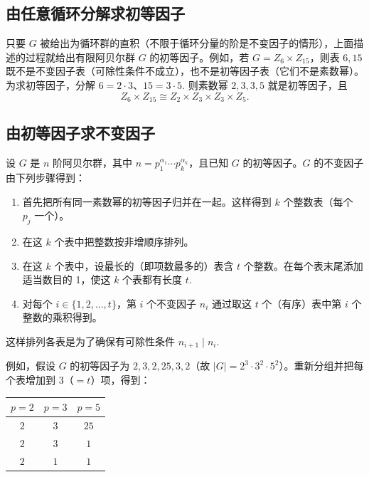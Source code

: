 \subsection*{由任意循环分解求初等因子}

只要 \(G\) 被给出为循环群的直积（不限于循环分量的阶是不变因子的情形），上面描述的过程就给出有限阿贝尔群 \(G\) 的初等因子。例如，若 \(G = Z_6 \times Z_{15}\)，则表 \(6, 15\) 既不是不变因子表（可除性条件不成立），也不是初等因子表（它们不是素数幂）。为求初等因子，分解 \(6 = 2 \cdot 3\)、\(15 = 3 \cdot 5\). 则素数幂 \(2, 3, 3, 5\) 就是初等因子，且
\[
Z_6 \times Z_{15} \cong Z_2 \times Z_3 \times Z_3 \times Z_5.
\]

\subsection*{由初等因子求不变因子}

设 \(G\) 是 \(n\) 阶阿贝尔群，其中 \(n = p_1^{\alpha_1} \cdots p_k^{\alpha_k}\)，且已知 \(G\) 的初等因子。\(G\) 的不变因子由下列步骤得到：

\begin{enumerate}[label=(\arabic*)]
\item 首先把所有同一素数幂的初等因子归并在一起。这样得到 \(k\) 个整数表（每个 \(p_j\) 一个）。
\item 在这 \(k\) 个表中把整数按非增顺序排列。
\item 在这 \(k\) 个表中，设最长的（即项数最多的）表含 \(t\) 个整数。在每个表末尾添加适当数目的 1，使这 \(k\) 个表都有长度 \(t\).
\item 对每个 \(i \in \{1, 2, \ldots, t\}\)，第 \(i\) 个不变因子 \(n_i\) 通过取这 \(t\) 个（有序）表中第 \(i\) 个整数的乘积得到。
\end{enumerate}

这样排列各表是为了确保有可除性条件 \(n_{i+1} \mid n_i\).

例如，假设 \(G\) 的初等因子为 \(2, 3, 2, 25, 3, 2\)（故 \(|G| = 2^3 \cdot 3^2 \cdot 5^2\)）。重新分组并把每个表增加到 3（\(= t\)）项，得到：

\begin{center}
\begin{tabular}{ccc}
\hline
\(p = 2\) & \(p = 3\) & \(p = 5\) \\
\hline
\(2\) & \(3\) & \(25\) \\
\(2\) & \(3\) & \(1\) \\
\(2\) & \(1\) & \(1\) \\
\hline
\end{tabular}
\end{center}

